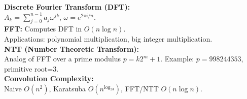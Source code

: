 \textbf{Discrete Fourier Transform (DFT):} \\[1mm]
$A_k=\sum_{j=0}^{n-1} a_j \omega^{jk}$, \quad $\omega=e^{2\pi i/n}$. \\

\textbf{FFT:} Computes DFT in $O(n\log n)$. \\[1mm]
Applications: polynomial multiplication, big integer multiplication. \\

\textbf{NTT (Number Theoretic Transform):} \\[1mm]
Analog of FFT over a prime modulus $p=k2^m+1$. Example: $p=998244353$, primitive root=3. \\

\textbf{Convolution Complexity:} \\[1mm]
Naive $O(n^2)$, Karatsuba $O(n^{\log_23})$, FFT/NTT $O(n\log n)$. \\